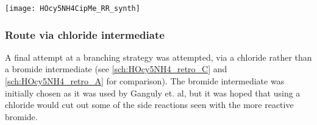 
\begin{scheme}[H]
	\begin{center}
		\texttt{[image: HOcy5NH4CipMe\_RR\_synth]}
		\caption{Synthesis of the cyclopentanol-CipMe conjugates   (\textit{SS}) and  (\textit{RR}) by peptide coupling. 
		\textit{SS} enantiomers are shown, but both were synthesised.
			a) NaI, TEA, acetonitrile, 100 $^{\circ}$C, 16 h, 49.9 \%. %
			b) TFA,  , r.t., 18 h, 95.6 \%. %
			c) EDC, HOBt, DIPEA, DMF, r.t., 16 h, 
			 (\textit{SS}): 54.7 \%,  %
			 (\textit{RR}): 38.7 \%. %
			\label{sch:HOcy5NH4CipMe_RR_synth}}
	\end{center}
\end{scheme}



\subsubsection{Route via chloride intermediate\label{sec:Cl4Cl}}

A final attempt at a branching strategy was attempted, via a chloride rather than a bromide intermediate (see \ref{sch:HOcy5NH4_retro_C} and \ref{sch:HOcy5NH4_retro_A} for comparison). The bromide intermediate was initially chosen as it was used by Ganguly et. al\cite{Ganguly2011}, but it was hoped that using a chloride would cut out some of the side reactions seen with the more reactive bromide.

